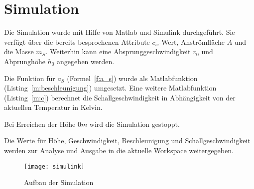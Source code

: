 \section{Simulation}\label{sec:simulation}

Die Simulation wurde mit Hilfe von Matlab und Simulink durchgeführt.
Sie verfügt über die bereits besprochenen Attribute $c_w$-Wert, Anströmfläche $A$ und die Masse $m_S$. Weiterhin kann eine Absprunggeschwindigkeit $v_0$ und Abprunghöhe $h_0$ angegeben werden.

Die Funktion für $a_S$ (Formel~\ref{f:a_s}) wurde als Matlabfunktion (Listing~\ref{m:beschleunigung}) umgesetzt.
Eine weitere Matlabfunktion (Listing~\ref{m:c}) berechnet die Schallgeschwindigkeit in Abhängigkeit von der aktuellen Temperatur in Kelvin.





Bei Erreichen der Höhe $0m$ wird die Simulation gestoppt.

Die Werte für Höhe, Geschwindigkeit, Beschleunigung und Schallgeschwindigkeit werden zur Analyse und Ausgabe in die aktuelle Workspace weitergegeben.

\begin{figure}[h]
  \centering
  \texttt{[image: simulink]}
  \caption{Aufbau der Simulation}
  \label{fig:simulink}
\end{figure}

